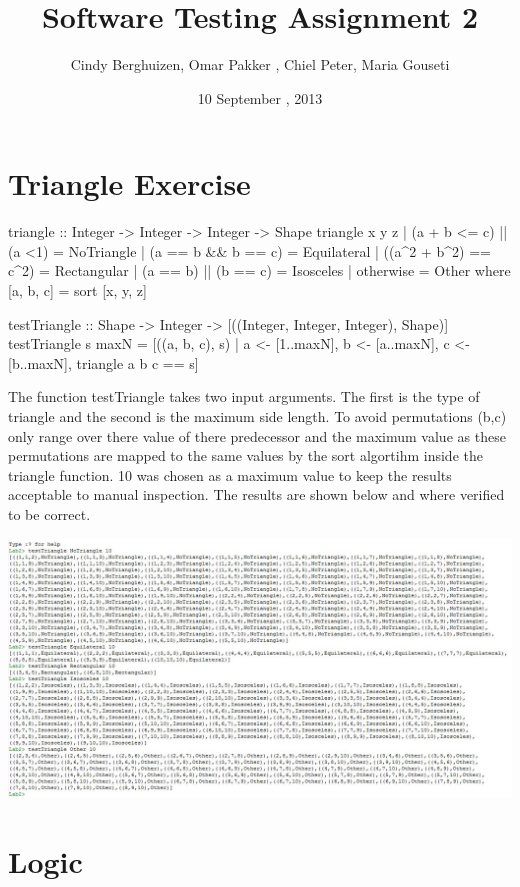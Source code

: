 \documentclass{article}
\begin{document}
\setlength{\parindent}{0cm}

\title{Software Testing Assignment 2}
\author{Cindy Berghuizen, Omar Pakker , Chiel Peter, Maria Gouseti}
\date{10 September , 2013}
\maketitle
\section*{Triangle Exercise}
\begin{code}
triangle :: Integer -> Integer -> Integer -> Shape
triangle x y z		| (a + b <= c) || (a <1)	= NoTriangle
 			| (a == b && b == c) 		= Equilateral
 			| ((a^2 + b^2) == c^2) 		= Rectangular
 			| (a == b) || (b == c) 		= Isosceles
 			| otherwise			= Other
 			where [a, b, c] = sort [x, y, z]

testTriangle :: Shape -> Integer -> [((Integer, Integer, Integer), Shape)]
testTriangle s maxN = [((a, b, c), s)	| a <- [1..maxN], 
					  b <- [a..maxN], 
					  c <- [b..maxN], 
					  triangle a b c == s]
\end{code}

The function testTriangle takes two input arguments. The first is the type of triangle and the second is the maximum side length. To avoid permutations (b,c) only range over there value of there predecessor and the maximum value as these permutations are mapped to the same values by the sort algortihm inside the triangle function. 10 was chosen as  a maximum value to keep the results acceptable to manual inspection. The results are shown below and where verified to be correct.
\vspace{.3cm}

\includegraphics[scale=0.58]{Knipsel}

\section*{ Logic}
\end{document}
